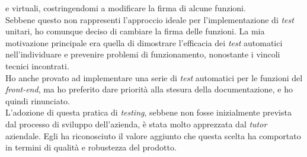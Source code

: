 e virtuali, costringendomi a modificare la firma di alcune funzioni.\\
Sebbene questo non rappresenti l'approccio ideale per l'implementazione di \textit{test} unitari, ho comunque deciso di 
cambiare la firma delle funzioni. La mia motivazione principale era quella di dimostrare l'efficacia dei \textit{test} 
automatici nell'individuare e prevenire problemi di funzionamento, nonostante i vincoli tecnici incontrati.\\
Ho anche provato ad implementare una serie di \textit{test} automatici per le funzioni del \textit{front-end}, ma ho 
preferito dare priorità alla stesura della documentazione, e ho quindi rinunciato.\\
L'adozione di questa pratica di \textit{testing}, sebbene non fosse inizialmente prevista dal processo di 
sviluppo dell'azienda, è stata molto apprezzata dal \textit{tutor} aziendale. Egli ha riconosciuto il valore aggiunto che 
questa scelta ha comportato in termini di qualità e robustezza del prodotto.